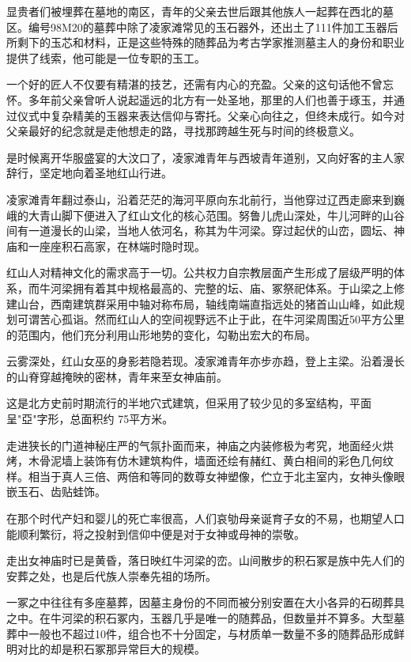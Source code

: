 显贵者们被埋葬在墓地的南区，青年的父亲去世后跟其他族人一起葬在西北的墓区。编号98M20的墓葬中除了凌家滩常见的玉石器外，还出土了111件加工玉器后所剩下的玉芯和材料，正是这些特殊的随葬品为考古学家推测墓主人的身份和职业提供了线索，他可能是一位专职的玉工。

一个好的匠人不仅要有精湛的技艺，还需有内心的充盈。父亲的这句话他不曾忘怀。多年前父亲曾听人说起遥远的北方有一处圣地，那里的人们也善于琢玉，并通过仪式中复杂精美的玉器来表达信仰与寄托。父亲心向往之，但终未成行。如今对父亲最好的纪念就是走他想走的路，寻找那跨越生死与时间的终极意义。

是时候离开华服盛宴的大汶口了，凌家滩青年与西坡青年道别，又向好客的主人家辞行，坚定地向着圣地红山行进。

凌家滩青年翻过泰山，沿着茫茫的海河平原向东北前行，当他穿过辽西走廊来到巍峨的大青山脚下便进入了红山文化的核心范围。努鲁儿虎山深处，牛儿河畔的山谷间有一道漫长的山梁，当地人依河名，称其为牛河梁。穿过起伏的山峦，圆坛、神庙和一座座积石高家，在林端时隐时现。

红山人对精神文化的需求高于一切。公共权力自宗教层面产生形成了层级严明的体系，而牛河梁拥有着其中规格最高的、完整的坛、庙、冢祭祀体系。于山梁之上修建山台，西南建筑群采用中轴对称布局，轴线南端直指远处的猪首山山峰，如此规划可谓苦心孤诣。然而红山人的空间视野远不止于此，在牛河梁周围近50平方公里的范围内，他们充分利用山形地势的变化，勾勒出宏大的布局。

云雾深处，红山女巫的身影若隐若现。凌家滩青年亦步亦趋，登上主梁。沿着漫长的山脊穿越掩映的密林，青年来至女神庙前。

这是北方史前时期流行的半地穴式建筑，但采用了较少见的多室结构，平面呈"亞"字形，总面积约 75平方米。

走进狭长的门道神秘庄严的气氛扑面而来，神庙之内装修极为考究，地面经火烘烤，木骨泥墙上装饰有仿木建筑构件，墙面还绘有赭红、黄白相间的彩色几何纹样。相当于真人三倍、两倍和等同的数尊女神塑像，伫立于北主室内，女神头像眼嵌玉石、齿贴蛙饰。

在那个时代产妇和婴儿的死亡率很高，人们哀劬母亲诞育子女的不易，也期望人口能顺利繁衍，将之投射到信仰中便是对于女神或母神的崇敬。

走出女神庙时已是黄昏，落日映红牛河梁的峦。山间散步的积石冢是族中先人们的安葬之处，也是后代族人崇奉先祖的场所。

一冢之中往往有多座墓葬，因墓主身份的不同而被分别安置在大小各异的石砌葬具之中。在牛河梁的积石冢内，玉器几乎是唯一的随葬品，但数量并不算多。大型墓葬中一般也不超过10件，组合也不十分固定，与材质单一数量不多的随葬品形成鲜明对比的却是积石冢那异常巨大的规模。

